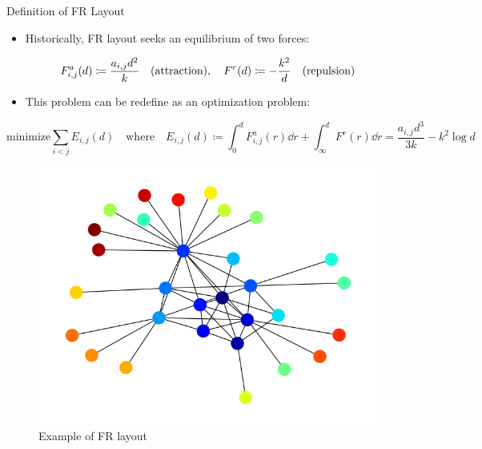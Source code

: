 \documentclass[13pt,aspectratio=169,table,dvipdfmx]{beamer}
\newcommand{\defeq}{\coloneqq}
\newif\ifShowHidden
\begin{document}
\ifShowHidden
    \begin{frame}{Definition of FR Layout}
        \begin{itemize}
            \item Historically, FR layout seeks an equilibrium of two forces:
        \end{itemize}
        \begin{equation*}
            F_{i,j}^a(d) \defeq \frac{a_{i,j} d^2}{k} \text{\quad (attraction)}, \quad F^r(d) \defeq -\frac{k^2}{d} \text{\quad (repulsion)}
        \end{equation*}
        \begin{itemize}
            \item This problem can be redefine as an optimization problem:
        \end{itemize}
        \begin{equation*}
            \mathrm{minimize} \sum_{i<j} E_{i,j}(d)
            \quad \mathrm{where} \quad
            E_{i,j}(d) \defeq \int_{0}^{d} F_{i,j}^a(r) \dd{r} + \int_{\infty}^{d} F^r(r) \dd{r} = \frac{a_{i,j} d^3}{3k} - k^2\log{d}
        \end{equation*}
        \begin{figure}[htbp]
            \begin{minipage}{0.49\hsize}
                \centering
                \includegraphics[width=0.6\columnwidth]{imgs/example_fr.png}
                \caption{Example of FR layout}
            \end{minipage}
            \begin{minipage}{0.49\hsize}
                \centering
\end{minipage}
\end{figure}
\end{frame}
\end{document}
